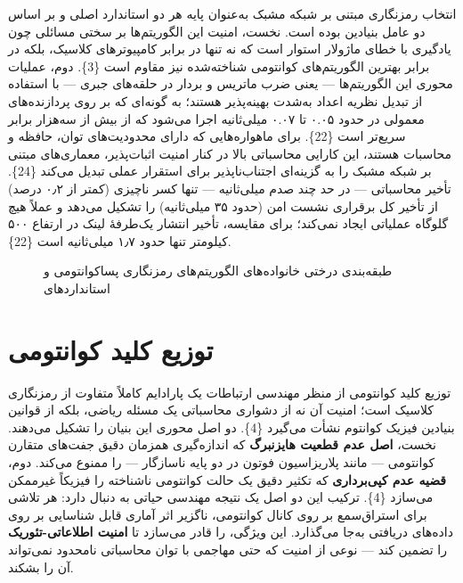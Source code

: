 \documentclass[a4paper,14pt]{extreport}
\begin{document}
انتخاب رمزنگاری مبتنی بر شبکه مشبک  به‌عنوان پایه هر دو استاندارد اصلی  و  بر اساس دو عامل بنیادین بوده است. نخست، امنیت این الگوریتم‌ها بر سختی مسائلی چون یادگیری با خطای ماژولار  استوار است که نه تنها در برابر کامپیوترهای کلاسیک، بلکه در برابر بهترین الگوریتم‌های کوانتومی شناخته‌شده نیز مقاوم است \{3\}. دوم، عملیات محوری این الگوریتم‌ها --- یعنی ضرب ماتریس و بردار در حلقه‌های جبری --- با استفاده از تبدیل نظریه اعداد  به‌شدت بهینه‌پذیر هستند؛ به گونه‌ای که  بر روی پردازنده‌های معمولی در حدود ۰.۰۵ تا ۰.۰۷ میلی‌ثانیه اجرا می‌شود که از  بیش از سه‌هزار برابر سریع‌تر است \{22\}. برای ماهواره‌هایی که دارای محدودیت‌های توان، حافظه و محاسبات هستند، این کارایی محاسباتی بالا در کنار امنیت اثبات‌پذیر، معماری‌های مبتنی بر شبکه مشبک را به گزینه‌ای اجتناب‌ناپذیر برای استقرار عملی تبدیل می‌کند \{24\}. تأخیر محاسباتی  --- در حد چند صدم میلی‌ثانیه --- تنها کسر ناچیزی (کمتر از ۰٫۲ درصد) از تأخیر کل برقراری نشست امن (حدود ۳۵ میلی‌ثانیه) را تشکیل می‌دهد و عملاً هیچ گلوگاه  عملیاتی ایجاد نمی‌کند؛ برای مقایسه، تأخیر انتشار یک‌طرفهٔ لینک  در ارتفاع ۵۰۰ کیلومتر تنها حدود ۱٫۷ میلی‌ثانیه است \{22\}.

\begin{figure}[H]
\centering
{}
\caption{طبقه‌بندی درختی خانواده‌های الگوریتم‌های رمزنگاری پساکوانتومی و استانداردهای }
\label{fig:2-3}
\end{figure}
\section{توزیع کلید کوانتومی}

توزیع کلید کوانتومی  از منظر مهندسی ارتباطات یک پارادایم کاملاً متفاوت از رمزنگاری کلاسیک است؛ امنیت آن نه از دشواری محاسباتی یک مسئله ریاضی، بلکه از قوانین بنیادین فیزیک کوانتوم نشأت می‌گیرد \{4\}. دو اصل محوری این بنیان را تشکیل می‌دهند. نخست، \textbf{اصل عدم قطعیت هایزنبرگ}  که اندازه‌گیری همزمان دقیق جفت‌های متقارن کوانتومی --- مانند پلاریزاسیون فوتون در دو پایه ناسازگار --- را ممنوع می‌کند. دوم، \textbf{قضیه عدم کپی‌برداری}  که تکثیر دقیق یک حالت کوانتومی ناشناخته را فیزیکاً غیرممکن می‌سازد \{4\}. ترکیب این دو اصل یک نتیجه مهندسی حیاتی به دنبال دارد: هر تلاشی برای استراق‌سمع بر روی کانال کوانتومی، ناگزیر اثر آماری قابل شناسایی بر روی داده‌های دریافتی به‌جا می‌گذارد. این ویژگی،  را قادر می‌سازد تا \textbf{امنیت اطلاعاتی-تئوریک}  را تضمین کند --- نوعی از امنیت که حتی مهاجمی با توان محاسباتی نامحدود نمی‌تواند آن را بشکند.
\end{document}
